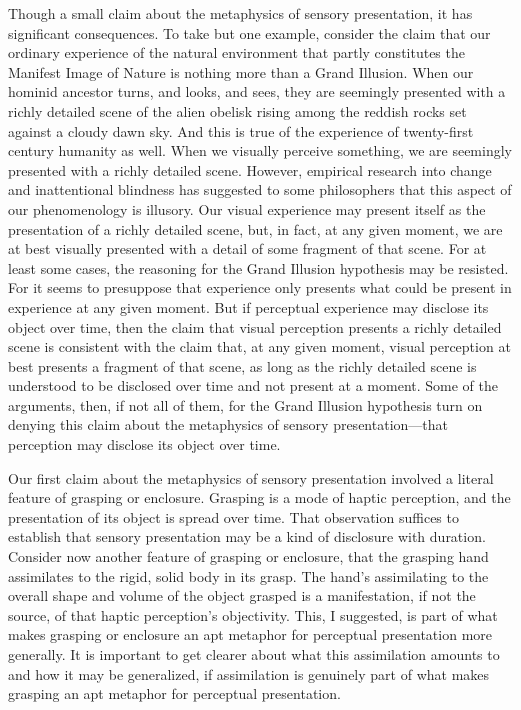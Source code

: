 \documentclass[12pt]{article}
\begin{document}
Though a small claim about the metaphysics of sensory presentation, it has significant consequences. To take but one example, consider the claim that our ordinary experience of the natural environment that partly constitutes the Manifest Image of Nature is nothing more than a Grand Illusion. When our hominid ancestor turns, and looks, and sees, they are seemingly presented with a richly detailed scene of the alien obelisk rising among the reddish rocks set against a cloudy dawn sky. And this is true of the experience of twenty-first century humanity as well. When we visually perceive something, we are seemingly presented with a richly detailed scene. However, empirical research into change and inattentional blindness has suggested to some philosophers that this aspect of our phenomenology is illusory. Our visual experience may present itself as the presentation of a richly detailed scene, but, in fact, at any given moment, we are at best visually presented with a detail of some fragment of that scene. For at least some cases, the reasoning for the Grand Illusion hypothesis may be resisted. For it seems to presuppose that experience only presents what could be present in experience at any given moment. But if perceptual experience may disclose its object over time, then the claim that visual perception presents a richly detailed scene is consistent with the claim that, at any given moment, visual perception at best presents a fragment of that scene, as long as the richly detailed scene is understood to be disclosed over time and not present at a moment. Some of the arguments, then, if not all of them, for the Grand Illusion hypothesis turn on denying this claim about the metaphysics of sensory presentation---that perception may disclose its object over time.

Our first claim about the metaphysics of sensory presentation involved a literal feature of grasping or enclosure. Grasping is a mode of haptic perception, and the presentation of its object is spread over time. That observation suffices to establish that sensory presentation may be a kind of disclosure with duration. Consider now another feature of grasping or enclosure, that the grasping hand assimilates to the rigid, solid body in its grasp. The hand's assimilating to the overall shape and volume of the object grasped is a manifestation, if not the source, of that haptic perception's objectivity. This, I suggested, is part of what makes grasping or enclosure an apt metaphor for perceptual presentation more generally. It is important to get clearer about what this assimilation amounts to and how it may be generalized, if assimilation is genuinely part of what makes grasping an apt metaphor for perceptual presentation.
\end{document}
